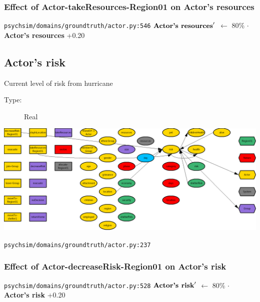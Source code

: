 \documentclass{article}%
\begin{document}
%
\subsubsection{Effect of Actor{-}takeResources{-}Region01 on Actor's resources}%
\label{ssubsec:Effect of Actor{-}takeResources{-}Region01 on Actor's resources}%
\begin{flushleft}%
\verb|psychsim/domains/groundtruth/actor.py:546|%
\linebreak%
$\mbox{\textbf{Actor's resources}} '$%
$\leftarrow$%
80\%%
$\cdot$%
\textbf{Actor's resources}%
+0.20%
\end{flushleft}

%
\subsection{Actor's risk}%
\label{subsec:Actor's risk}%
Current level of risk from hurricane%
\begin{description}%
\item[Type:]%
Real%
\end{description}%
\includegraphics[width=\textwidth]{images/riskOfActor.png}%
\begin{flushleft}%
\verb|psychsim/domains/groundtruth/actor.py:237|%
\end{flushleft}%
\subsubsection{Effect of Actor{-}decreaseRisk{-}Region01 on Actor's risk}%
\label{ssubsec:Effect of Actor{-}decreaseRisk{-}Region01 on Actor's risk}%
\begin{flushleft}%
\verb|psychsim/domains/groundtruth/actor.py:528|%
\linebreak%
$\mbox{\textbf{Actor's risk}} '$%
$\leftarrow$%
80\%%
$\cdot$%
\textbf{Actor's risk}%
+0.20%
\end{flushleft}

%
\end{document}
